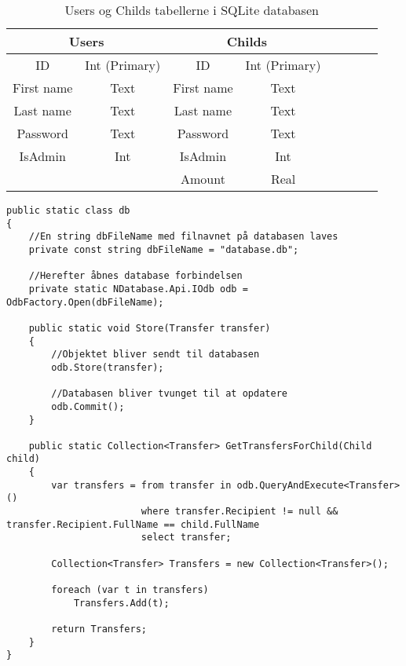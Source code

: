\begin{table}[H]
\begin{tabular}{||c|c||c|c||c|c||c|c}
\hline 
\multicolumn{2}{||c||}{Users} & \multicolumn{2}{c||}{Childs}\\
\hline
ID & Int (Primary) & ID & Int (Primary) \\ 
\hline 
First name & Text & First name & Text \\ 
\hline 
Last name & Text & Last name & Text \\ 
\hline 
Password & Text & Password & Text \\ 
\hline 
IsAdmin & Int & IsAdmin & Int \\ 
\hline 
 &  & Amount & Real \\ 
\hline 
\end{tabular}
\caption{Users og Childs tabellerne i SQLite databasen}
\label{tab:sql2}
\end{table}

\begin{lstlisting}[caption={Statisk klasse, der forbinder til objekt databasen NDatabase},label={lst:db}]
public static class db
{
	//En string dbFileName med filnavnet på databasen laves
	private const string dbFileName = "database.db";
	
	//Herefter åbnes database forbindelsen
	private static NDatabase.Api.IOdb odb = OdbFactory.Open(dbFileName);

	public static void Store(Transfer transfer)
	{
		//Objektet bliver sendt til databasen
		odb.Store(transfer);
		
		//Databasen bliver tvunget til at opdatere
		odb.Commit();
	}
	
	public static Collection<Transfer> GetTransfersForChild(Child child)
	{
		var transfers = from transfer in odb.QueryAndExecute<Transfer>()
						where transfer.Recipient != null && transfer.Recipient.FullName == child.FullName
						select transfer;

		Collection<Transfer> Transfers = new Collection<Transfer>();

		foreach (var t in transfers)
			Transfers.Add(t);

		return Transfers;
	}
}
\end{lstlisting}

